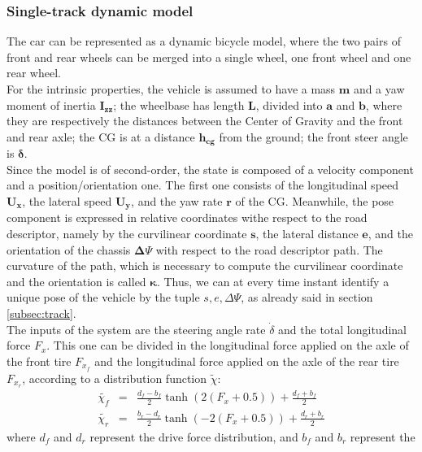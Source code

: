\documentclass[a4paper, onecolumn, 12pt]{article}
\begin{document}
\subsubsection{Single-track dynamic model}
The car can be represented as a dynamic bicycle model, where the two pairs of
front and rear wheels can be merged into a single wheel, one front wheel and one
rear wheel.\\
For the intrinsic properties, the vehicle is assumed to have a mass $\mathbf{m}$
and a yaw moment of inertia $\mathbf{I_{zz}}$; the wheelbase has length
$\mathbf{L}$, divided into $\mathbf{a}$ and $\mathbf{b}$, where they are
respectively the distances between the Center of Gravity and the front and rear
axle; the CG is at a distance $\mathbf{h_{cg}}$ from the ground; the front steer
angle is $\mathbf{\delta}$.\\
Since the model is of second-order, the state is composed of a velocity
component and a position/orientation one. The first one consists of the
longitudinal speed $\mathbf{U_x}$, the lateral speed $\mathbf{U_y}$, and the yaw
rate $\mathbf{r}$ of the CG. Meanwhile, the pose component is expressed in
relative coordinates withe respect to the road descriptor, namely by the
curvilinear coordinate $\mathbf{s}$, the lateral distance $\mathbf{e}$, and the
orientation of the chassis $\mathbf{\Delta \varPsi}$ with respect to the road
descriptor path. The curvature of the path, which is necessary to compute the
curvilinear coordinate and the orientation is called $\mathbf{\kappa}$. Thus, we
can at every time instant identify a unique pose of the vehicle by the tuple
$s,e,\Delta \varPsi$, as already said in section \ref*{subsec:track}.\\
The inputs of the system are the steering angle rate $\dot{\delta}$ and the
total longitudinal force $F_x$. This one can be divided in the longitudinal
force applied on the axle of the front tire $F_{x_f}$ and the longitudinal force
applied on the axle of the rear tire $F_{x_r}$, according to a distribution
function $\tilde{\chi}$:
\begin{subequations}
    \begin{eqnarray}
        \tilde{\chi_f} &=& \frac{d_f - b_f}{2}\tanh(2(F_x+0.5))+\frac{d_f+b_f}{2} \\
        \tilde{\chi_r} &=& \frac{b_r-d_r}{2}\tanh(-2(F_x+0.5))+\frac{d_r+b_r}{2}
    \end{eqnarray}
\end{subequations}
where $d_f$ and $d_r$ represent the drive force distribution, and $b_f$ and $b_r$ represent the 
\end{document}
